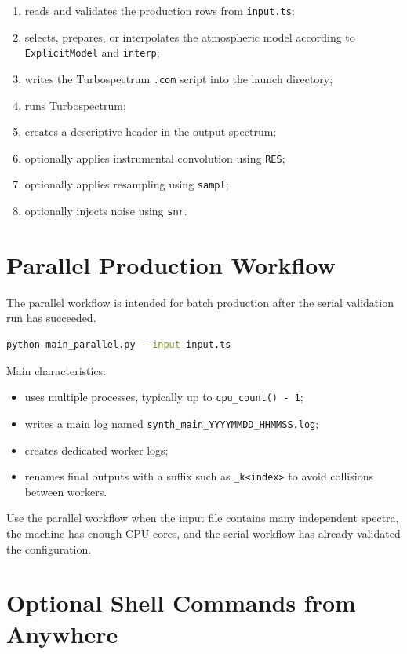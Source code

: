 \documentclass[11pt,a4paper]{article}
\newcommand{\code}[1]{\texttt{#1}}
\begin{document}
\begin{enumerate}
  \item reads and validates the production rows from \code{input.ts};
  \item selects, prepares, or interpolates the atmospheric model according to \code{ExplicitModel} and \code{interp};
  \item writes the Turbospectrum \code{.com} script into the launch directory;
  \item runs Turbospectrum;
  \item creates a descriptive header in the output spectrum;
  \item optionally applies instrumental convolution using \code{RES};
  \item optionally applies resampling using \code{sampl};
  \item optionally injects noise using \code{snr}.
\end{enumerate}

\section{Parallel Production Workflow}

The parallel workflow is intended for batch production after the serial validation run has succeeded.

\begin{lstlisting}[language=bash]
python main_parallel.py --input input.ts
\end{lstlisting}

Main characteristics:

\begin{itemize}
  \item uses multiple processes, typically up to \code{cpu\_count() - 1};
  \item writes a main log named \code{synth\_main\_YYYYMMDD\_HHMMSS.log};
  \item creates dedicated worker logs;
  \item renames final outputs with a suffix such as \code{\_k<index>} to avoid collisions between workers.
\end{itemize}

Use the parallel workflow when the input file contains many independent spectra, the machine has enough CPU cores, and the serial workflow has already validated the configuration.

\section{Optional Shell Commands from Anywhere}
\end{document}
